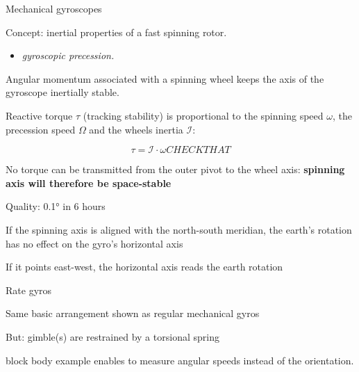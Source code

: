 \documentclass[compress]{beamer}
\begin{document}
\begin{frame}{Mechanical gyroscopes}

Concept: inertial properties of a fast spinning rotor.

\begin{itemize}

\item
  \emph{gyroscopic precession.}
\end{itemize}

Angular momentum associated with a spinning wheel keeps the axis of the
gyroscope inertially stable.

Reactive torque $\tau$ (tracking stability) is proportional to the
spinning speed $\omega$, the precession speed $\Omega$ and the wheels
inertia $\mathcal{I}$:

\[
    \tau = \mathcal{I}\cdot\omega CHECK THAT
\]

No torque can be transmitted from the outer pivot to the wheel axis: {\bf
    spinning axis will therefore be space-stable}

Quality: 0.1° in 6 hours

If the spinning axis is aligned with the north-south meridian, the
earth's rotation has no effect on the gyro's horizontal axis

If it points east-west, the horizontal axis reads the
earth rotation
\end{frame}


\begin{frame}{Rate gyros}

Same basic arrangement shown as regular mechanical gyros

But: gimble(s) are restrained by a torsional spring

\begin{beamercolorbox}{block body example}
  enables to measure angular speeds instead of the orientation.
\end{beamercolorbox}

\end{frame}
\end{document}

